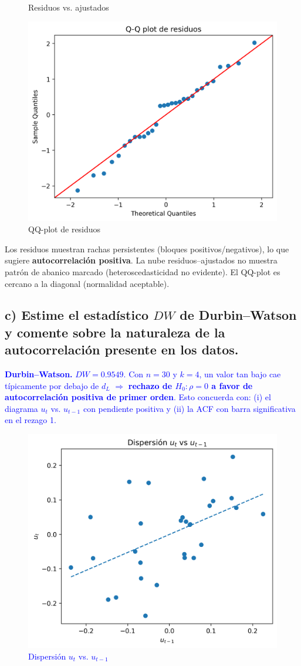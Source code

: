 \documentclass[10pt]{article}
\begin{document}
{\begin{figure}[H]
        \caption{Residuos vs. ajustados}
    \end{figure}
    \begin{figure}[H]
        \centering
        \includegraphics[width=0.55\linewidth]{../plots/python/ex7/ex7_qqplot_residuos.png}
        \caption{QQ-plot de residuos}
    \end{figure}
    Los residuos muestran rachas persistentes (bloques positivos/negativos), lo que sugiere \textbf{autocorrelación positiva}. La nube residuos–ajustados no muestra patrón de abanico marcado (heteroscedasticidad no evidente). El QQ-plot es cercano a la diagonal (normalidad aceptable).
    }

    \subsection{c) Estime el estadístico \texorpdfstring{$DW$}{DW} de Durbin--Watson y comente sobre la naturaleza de la autocorrelación presente en los datos.}
    \textcolor{blue}{
    \textbf{Durbin–Watson.} $DW=0.9549$. Con $n=30$ y $k=4$, un valor tan bajo cae típicamente por debajo de $d_L$ $\Rightarrow$ \textbf{rechazo de $H_0:\rho=0$ a favor de autocorrelación positiva de primer orden}. Esto concuerda con: (i) el diagrama $u_t$ vs. $u_{t-1}$ con pendiente positiva y (ii) la ACF con barra significativa en el rezago 1.\\
    \begin{figure}[H]
        \centering
        \includegraphics[width=0.55\linewidth]{../plots/python/ex7/ex7_scatter_resid_lag.png}
        \caption{Dispersión $u_t$ vs. $u_{t-1}$}
    \end{figure}
    }
\end{document}
